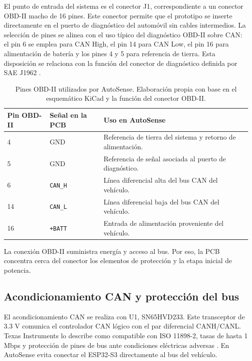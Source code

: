 \documentclass[12pt,letterpaper]{report}
\begin{document}
El punto de entrada del sistema es el conector J1, correspondiente a un conector OBD-II macho de 16 pines. Este conector permite que el prototipo se inserte directamente en el puerto de diagnóstico del automóvil sin cables intermedios. La selección de pines se alinea con el uso típico del diagnóstico OBD-II sobre CAN: el pin 6 se emplea para CAN High, el pin 14 para CAN Low, el pin 16 para alimentación de batería y los pines 4 y 5 para referencia de tierra. Esta disposición se relaciona con la función del conector de diagnóstico definida por SAE J1962 \cite{sae2016_j1962_diagnostic_connector}.

\begin{table}[!htbp]
\centering
\caption{Pines OBD-II utilizados por AutoSense. Elaboración propia con base en el esquemático KiCad y la función del conector OBD-II.}
\label{tab:hardware-pines-obd}
\renewcommand{\arraystretch}{1.08}
\setlength{\tabcolsep}{5pt}
\small
\begin{tabular}{@{}p{}p{}p{}@{}}
\toprule
Pin OBD-II & Señal en la PCB & Uso en AutoSense \\
\midrule
4 & GND & Referencia de tierra del sistema y retorno de alimentación. \\
5 & GND & Referencia de señal asociada al puerto de diagnóstico. \\
6 & \texttt{CAN\_H} & Línea diferencial alta del bus CAN del vehículo. \\
14 & \texttt{CAN\_L} & Línea diferencial baja del bus CAN del vehículo. \\
16 & \texttt{+BATT} & Entrada de alimentación proveniente del vehículo. \\
\bottomrule
\end{tabular}
\end{table}

La conexión OBD-II suministra energía y acceso al bus. Por eso, la PCB concentra cerca del conector los elementos de protección y la etapa inicial de potencia.

\subsection{Acondicionamiento CAN y protección del bus}

El acondicionamiento CAN se realiza con U1, SN65HVD233. Este transceptor de 3.3 V comunica el controlador CAN lógico con el par diferencial CANH/CANL. Texas Instruments lo describe como compatible con ISO 11898-2, tasas de hasta 1 Mbps y protección de pines de bus ante condiciones eléctricas adversas \cite{ti2026_sn65hvd23x_datasheet}. En AutoSense evita conectar el ESP32-S3 directamente al bus del vehículo.
\end{document}
